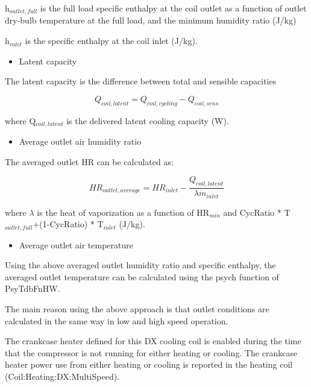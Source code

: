 h\(_{outlet,full}\) is the full load specific enthalpy at the coil outlet as a function of outlet dry-bulb temperature at the full load, and the minimum humidity ratio (J/kg)

h\(_{inlet}\) is the specific enthalpy at the coil inlet (J/kg).

\begin{itemize}
  \item Latent capacity
\end{itemize}

The latent capacity is the difference between total and sensible capacities

\begin{equation}
  Q_{coil,latent} = Q_{coil,cycling} - Q_{coil,sens}
\end{equation}

where Q\(_{coil,latent}\) is the delivered latent cooling capacity (W).

\begin{itemize}
  \item Average outlet air humidity ratio
\end{itemize}

The averaged outlet HR can be calculated as:

\begin{equation}
  HR_{outlet,average} = HR_{inlet} - \frac{Q_{coil,latent}}{{\lambda}\dot{m}_{inlet}}
\end{equation}

where \(\lambda\) is the heat of vaporization as a function of HR\(_{min}\) and CycRatio * T\(_{outlet,full}\)+(1-CycRatio) * T\(_{inlet}\) (J/kg).

\begin{itemize}
  \item Average outlet air temperature
\end{itemize}

Using the above averaged outlet humidity ratio and specific enthalpy, the averaged outlet temperature can be calculated using the psych function of PsyTdbFnHW.

The main reason using the above approach is that outlet conditions are calculated in the same way in low and high speed operation.

The crankcase heater defined for this DX cooling coil is enabled during the time that the compressor is not running for either heating or cooling. The crankcase heater power use from either heating or cooling is reported in the heating coil (Coil:Heating:DX:MultiSpeed).

